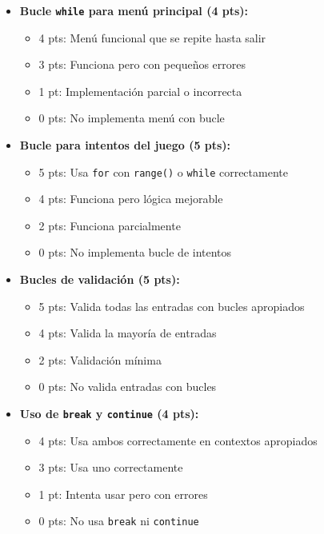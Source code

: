 \documentclass[12pt,a4paper]{article}
\begin{document}
\begin{itemize}[leftmargin=*]
    \item \textbf{Bucle \texttt{while} para menú principal (4 pts):}
    \begin{itemize}
        \item 4 pts: Menú funcional que se repite hasta salir
        \item 3 pts: Funciona pero con pequeños errores
        \item 1 pt: Implementación parcial o incorrecta
        \item 0 pts: No implementa menú con bucle
    \end{itemize}
    
    \item \textbf{Bucle para intentos del juego (5 pts):}
    \begin{itemize}
        \item 5 pts: Usa \texttt{for} con \texttt{range()} o \texttt{while} correctamente
        \item 4 pts: Funciona pero lógica mejorable
        \item 2 pts: Funciona parcialmente
        \item 0 pts: No implementa bucle de intentos
    \end{itemize}
    
    \item \textbf{Bucles de validación (5 pts):}
    \begin{itemize}
        \item 5 pts: Valida todas las entradas con bucles apropiados
        \item 4 pts: Valida la mayoría de entradas
        \item 2 pts: Validación mínima
        \item 0 pts: No valida entradas con bucles
    \end{itemize}
    
    \item \textbf{Uso de \texttt{break} y \texttt{continue} (4 pts):}
    \begin{itemize}
        \item 4 pts: Usa ambos correctamente en contextos apropiados
        \item 3 pts: Usa uno correctamente
        \item 1 pt: Intenta usar pero con errores
        \item 0 pts: No usa \texttt{break} ni \texttt{continue}
    \end{itemize}
\end{itemize}
\end{document}
